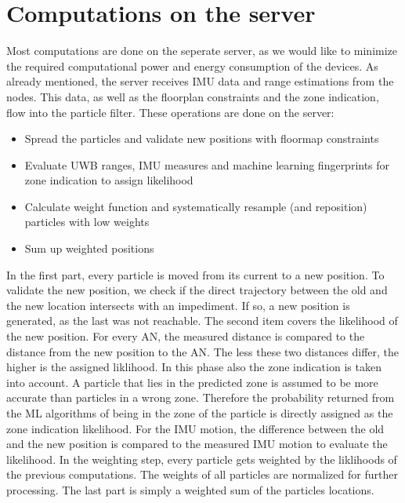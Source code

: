 \section{Computations on the server}
Most computations are done on the seperate server, as we would like to minimize the required computational power and energy consumption of the devices. As already mentioned, the server receives IMU data and range estimations from the nodes. This data, as well as the floorplan constraints and the zone indication, flow into the particle filter. These operations are done on the server:
\begin{itemize}
\item Spread the particles and validate new positions with floormap constraints
\item Evaluate UWB ranges, IMU measures and machine learning fingerprints for zone indication to assign likelihood
\item Calculate weight function and systematically resample (and reposition) particles with low weights
\item Sum up weighted positions
\end{itemize}

In the first part, every particle is moved from its current to a new position. To validate the new position, we check if the direct trajectory between the old and the new location intersects with an impediment. If so, a new position is generated, as the last was not reachable.
The second item covers the likelihood of the new position. For every AN, the measured distance is compared to the distance from the new position to the AN. The less these two distances differ, the higher is the assigned liklihood. In this phase also the zone indication is taken into account. A particle that lies in the predicted zone is assumed to be more accurate than particles in a wrong zone. Therefore the probability returned from the ML algorithms of being in the zone of the particle is directly assigned as the zone indication likelihood. For the IMU motion, the difference between the old and the new position is compared to the measured IMU motion to evaluate the likelihood.
In the weighting step, every particle gets weighted by the liklihoods of the previous computations. The weights of all particles are normalized for further processing.
The last part is simply a weighted sum of the particles locations.
